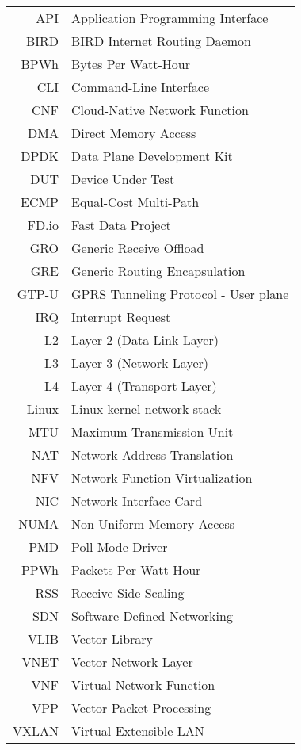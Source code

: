 \documentclass[english,bachelor,unicode,oneside]{ctufit-thesis}
\begin{document}
\begin{tabular}{rl}
API & Application Programming Interface\\
BIRD & BIRD Internet Routing Daemon\\
BPWh & Bytes Per Watt-Hour\\
CLI & Command-Line Interface\\
CNF & Cloud-Native Network Function\\
DMA & Direct Memory Access\\
DPDK & Data Plane Development Kit\\
DUT & Device Under Test\\
ECMP & Equal-Cost Multi-Path\\
FD.io & Fast Data Project\\
GRO & Generic Receive Offload\\
GRE & Generic Routing Encapsulation\\
GTP-U & GPRS Tunneling Protocol - User plane\\
IRQ & Interrupt Request\\
L2 & Layer 2 (Data Link Layer)\\
L3 & Layer 3 (Network Layer)\\
L4 & Layer 4 (Transport Layer)\\
Linux & Linux kernel network stack\\
MTU & Maximum Transmission Unit\\
NAT & Network Address Translation\\
NFV & Network Function Virtualization\\
NIC & Network Interface Card\\
NUMA & Non-Uniform Memory Access\\
PMD & Poll Mode Driver\\
PPWh & Packets Per Watt-Hour\\
RSS & Receive Side Scaling\\
SDN & Software Defined Networking\\
VLIB & Vector Library\\
VNET & Vector Network Layer\\
VNF & Virtual Network Function\\
VPP & Vector Packet Processing\\
VXLAN & Virtual Extensible LAN\\
\end{tabular}

\resumeTOCentries
\mainmatter\mainmatterinit %


\appendix\appendixinit %


\backmatter %

\printbibliography %

\end{document}
